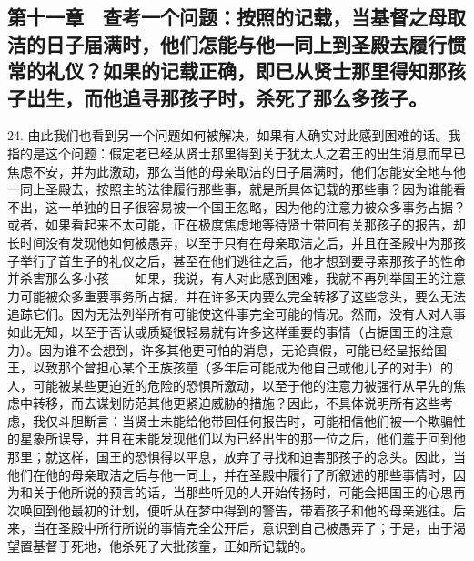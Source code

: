 
\subsection{第十一章　查考一个问题：按照的记载，当基督之母取洁的日子届满时，他们怎能与他一同上到圣殿去履行惯常的礼仪？如果的记载正确，即已从贤士那里得知那孩子出生，而他追寻那孩子时，杀死了那么多孩子。}

24. 由此我们也看到另一个问题如何被解决，如果有人确实对此感到困难的话。我指的是这个问题：假定老已经从贤士那里得到关于犹太人之君王的出生消息而早已焦虑不安，并为此激动，那么当他的母亲取洁的日子届满时，他们怎能安全地与他一同上圣殿去，按照主的法律履行那些事，就是所具体记载的那些事？因为谁能看不出，这一单独的日子很容易被一个国王忽略，因为他的注意力被众多事务占据？或者，如果看起来不太可能，正在极度焦虑地等待贤士带回有关那孩子的报告，却长时间没有发现他如何被愚弄，以至于只有在母亲取洁之后，并且在圣殿中为那孩子举行了首生子的礼仪之后，甚至在他们逃往之后，他才想到要寻索那孩子的性命并杀害那么多小孩——如果，我说，有人对此感到困难，我就不再列举国王的注意力可能被众多重要事务所占据，并在许多天内要么完全转移了这些念头，要么无法追踪它们。因为无法列举所有可能使这件事完全可能的情况。然而，没有人对人事如此无知，以至于否认或质疑很轻易就有许多这样重要的事情（占据国王的注意力）。因为谁不会想到，许多其他更可怕的消息，无论真假，可能已经呈报给国王，以致那个曾担心某个王族孩童（多年后可能成为他自己或他儿子的对手）的人，可能被某些更迫近的危险的恐惧所激动，以至于他的注意力被强行从早先的焦虑中转移，而去谋划防范其他更紧迫威胁的措施？因此，不具体说明所有这些考虑，我仅斗胆断言：当贤士未能给他带回任何报告时，可能相信他们被一个欺骗性的星象所误导，并且在未能发现他们以为已经出生的那一位之后，他们羞于回到他那里；就这样，国王的恐惧得以平息，放弃了寻找和迫害那孩子的念头。因此，当他们在他的母亲取洁之后与他一同上，并在圣殿中履行了所叙述的那些事情时，因为和关于他所说的预言的话，当那些听见的人开始传扬时，可能会把国王的心思再次唤回到他最初的计划，便听从在梦中得到的警告，带着孩子和他的母亲逃往。后来，当在圣殿中所行所说的事情完全公开后，意识到自己被愚弄了；于是，由于渴望置基督于死地，他杀死了大批孩童，正如所记载的。\par


